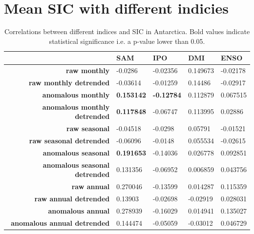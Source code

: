 \section{Mean SIC with different indicies}
\begin{table}[H]
\begin{tabular}{@{}rllll@{}}
\toprule
                                      & \textbf{SAM} & \textbf{IPO} & \textbf{DMI} & \textbf{ENSO} \\ \midrule
\textbf{raw monthly}                  & -0.0286      & -0.02356     & 0.149673     & -0.02178      \\
\textbf{raw monthly detrended}        & -0.03614     & -0.01259     & 0.14486      & -0.02917      \\
\textbf{anomalous monthly}            & \textbf{0.153142}     & \textbf{-0.12784}     & 0.112879     & 0.067515      \\
\textbf{anomalous monthly detrended}  & \textbf{0.117848}     & -0.06747     & 0.113995     & 0.02886       \\
\textbf{raw seasonal}                 & -0.04518     & -0.0298      & 0.05791      & -0.01521      \\
\textbf{raw seasonal detrended}       & -0.06096     & -0.0148      & 0.055534     & -0.02615      \\
\textbf{anomalous seasonal}           & \textbf{0.191653}     & -0.14036     & 0.026778     & 0.092851      \\
\textbf{anomalous seasonal detrended} & 0.131356     & -0.06952     & 0.006859     & 0.043756      \\
\textbf{raw annual}                   & 0.270046     & -0.13599     & 0.014287     & 0.115359      \\
\textbf{raw annual detrended}         & 0.13903      & -0.02698     & -0.02919     & 0.028031      \\
\textbf{anomalous annual}             & 0.278939     & -0.16029     & 0.014941     & 0.135027      \\
\textbf{anomalous annual detrended}   & 0.144474     & -0.05059     & -0.03012     & 0.046729      \\ \bottomrule
\end{tabular}
\caption{Correlations between different indices and SIC in Antarctica. Bold values indicate statistical significance i.e. a p-value lower than 0.05.}
\end{table}

